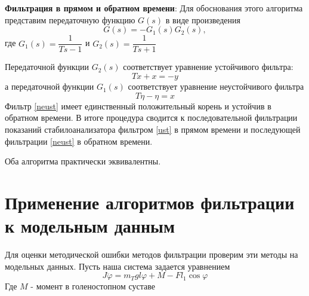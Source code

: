 \documentclass[a4paper,12pt, openany]{book}
\theoremstyle{plain} %
\theoremstyle{definition} %
\theoremstyle{remark} %
\numberwithin{equation}{chapter}
\begin{document}
{\textbf{Фильтрация в прямом и обратном времени}: Для
обоснования этого алгоритма представим передаточную функцию $G(s)$ в виде произведения
\[
    G(s) =-G_1(s)G_2(s),
\]
где $G_1(s)=\dfrac{1}{Ts-1}$ и $G_2(s)=\dfrac{1}{Ts+1}$

Передаточной функции $G_2(s)$ соответствует
уравнение устойчивого фильтра:
\begin{equation}\label{ust}
    T\dot{x}+x=-y
\end{equation}
а передаточной функции $G_1(s)$ соответствует уравнение неустойчивого фильтра
\begin{equation}\label{neust}
    T\dot{\eta}-\eta=x
\end{equation}
Фильтр \eqref{neust} имеет единственный положительный корень и устойчив в обратном времени. В
итоге процедура сводится к последовательной фильтрации показаний стабилоанализатора
фильтром \eqref{ust} в прямом времени и последующей фильтрации \eqref{neust} в обратном времени. 

Оба алгоритма практически эквивалентны.
\section{Применение алгоритмов фильтрации к модельным данным}
Для оценки методической ошибки методов фильтрации проверим эти методы на модельных данных.
Пусть наша система задается уравнением
\[
    J\ddot{\varphi}=m_Tgl\varphi+M-Fl_1\cos \varphi
\]
Где $M$ - момент в голеностопном суставе

}
\end{document}
